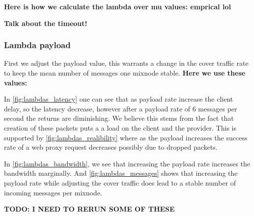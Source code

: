 \documentclass[a4paper,11pt,oneside]{report}
\begin{document}
\textbf{Here is how we calculate the lambda over mu values: emprical lol}

\textbf{Talk about the timeout!}

\subsubsection{Lambda payload}

First we adjust the payload value, this warrants a change in the cover traffic rate to keep the mean number of messages one mixnode stable. \textbf{Here we use these values: }

In \autoref{fig:lambdas_latency} one can see that as payload rate increase the client delay, so the latency decrease, however after a payload rate of 6 messages per second the returns are diminishing. We believe this stems from the fact that creation of these packets puts a a load on the client and the provider. This is supported by \autoref{fig:lambdas_realibility} where as the payload increases the success rate of a web proxy request decreases possibly due to dropped packets.

In \autoref{fig:lambdas_bandwidth}, we see that increasing the payload rate increases the bandwidth marginally. And \autoref{fig:lambdas_messages} shows that increasing the payload rate while adjusting the cover traffic does lead to a stable number of incoming messages per mixnode.

\textbf{TODO: I NEED TO RERUN SOME OF THESE}
\end{document}
